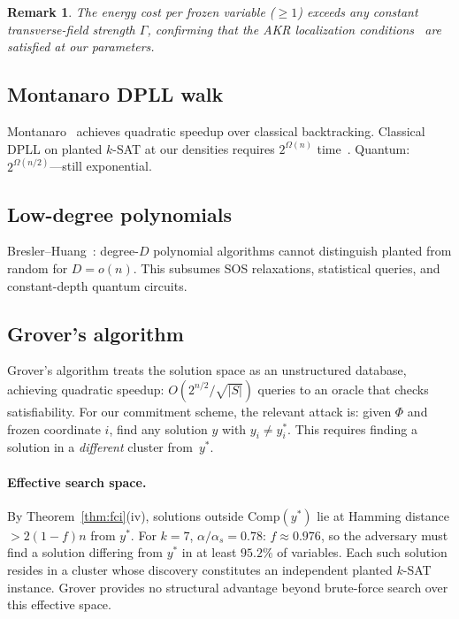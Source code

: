\documentclass[11pt]{article}
\newtheorem{remark}[theorem]{Remark}
\begin{document}
\begin{remark}
The energy cost per frozen variable ($\geq 1$) exceeds any constant transverse-field strength $\Gamma$, confirming that the AKR localization conditions~\cite{AKR10} are satisfied at our parameters.
\end{remark}


\subsection{Montanaro DPLL walk}
Montanaro~\cite{Mon18} achieves quadratic speedup over classical backtracking.  Classical DPLL on planted $k$-SAT at our densities requires $2^{\Omega(n)}$ time~\cite{ACO08}.  Quantum: $2^{\Omega(n/2)}$---still exponential.


\subsection{Low-degree polynomials}
Bresler--Huang~\cite{BH22}: degree-$D$ polynomial algorithms cannot distinguish planted from random for $D = o(n)$.  This subsumes SOS relaxations, statistical queries, and constant-depth quantum circuits.


\subsection{Grover's algorithm}\label{sec:grover}

Grover's algorithm treats the solution space as an unstructured database, achieving quadratic speedup: $O(2^{n/2}/\sqrt{|S|})$ queries to an oracle that checks satisfiability.  For our commitment scheme, the relevant attack is: given $\Phi$ and frozen coordinate $i$, find any solution $y$ with $y_i \neq y^*_i$.  This requires finding a solution in a \emph{different} cluster from~$y^*$.

\paragraph{Effective search space.}
By Theorem~\ref{thm:fci}(iv), solutions outside $\mathrm{Comp}(y^*)$ lie at Hamming distance $> 2(1-f)n$ from $y^*$.  For $k = 7$, $\alpha/\alpha_s = 0.78$: $f \approx 0.976$, so the adversary must find a solution differing from $y^*$ in at least $95.2\%$ of variables.  Each such solution resides in a cluster whose discovery constitutes an independent planted $k$-SAT instance.  Grover provides no structural advantage beyond brute-force search over this effective space.
\end{document}
